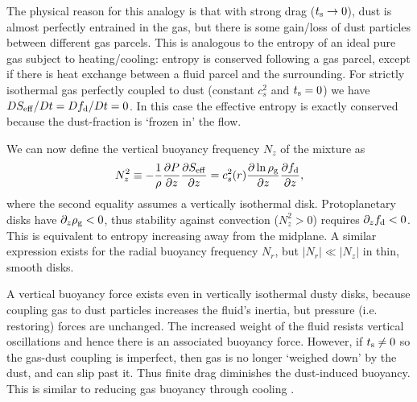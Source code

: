 The physical reason for this analogy is that with strong drag
($t_\mathrm{s}\to0$), dust is almost perfectly entrained in the gas, but
there is some gain/loss of dust particles between different  
gas parcels. This is analogous to the entropy of an ideal 
pure gas subject to heating/cooling: entropy is conserved following
a gas parcel, except if there is heat exchange between a fluid parcel and the
surrounding. For strictly isothermal gas perfectly coupled to dust
(constant $c_s^2$ and $t_\mathrm{s}=0$) we have 
$DS_\mathrm{eff}/ D t = Df_\mathrm{d}/D t=0$. In this case the effective 
entropy is exactly conserved because the dust-fraction is `frozen in' the
flow. 


We can now define the vertical buoyancy frequency $N_z$ of the mixture
as    
\begin{align}
  N_z^2 \equiv - \frac{1}{\rho}\frac{\partial P}{\partial z}\frac{\partial S_\mathrm{eff}}{\partial z}
  =c_s^2(r) \frac{\partial \ln{\rho_\mathrm{g}}}{\partial z}\frac{\partial f_\mathrm{d}}{\partial z},
\end{align}
where the second equality assumes a vertically isothermal disk. 
Protoplanetary disks have $\partial_z\rho_\mathrm{g}<0$, thus stability against
convection ($N_z^2>0$) requires $\partial_zf_\mathrm{d} <0 $. This is equivalent to
entropy increasing away from the midplane. A similar expression exists
for the radial buoyancy frequency $N_r$, but $|N_r|\ll |N_z|$ in thin,
smooth disks. 

A vertical buoyancy force exists even in vertically isothermal
dusty disks, because coupling gas to dust particles increases
the fluid's inertia, but pressure (i.e. restoring) forces are
unchanged. The increased weight of the fluid resists vertical
oscillations and hence there is an associated buoyancy force. However,
if $t_\mathrm{s}\neq0$ so the gas-dust coupling is imperfect, then gas is no
longer `weighed down' by the dust, and can slip past it. Thus finite
drag diminishes the dust-induced buoyancy. This is similar to reducing
gas buoyancy through cooling \citep{lin15}. 

